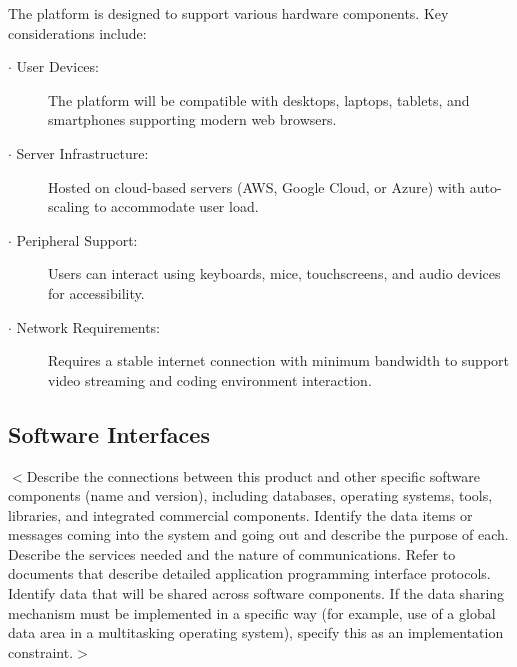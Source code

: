 \documentclass[a4paper, 11pt]{scrreprt}
\begin{document}
The platform is designed to support various hardware components. Key considerations include:
\begin{description}
    \item[$\cdot$ User Devices:] The platform will be compatible with desktops, laptops, tablets, and smartphones supporting modern web browsers.
    \item[$\cdot$ Server Infrastructure:] Hosted on cloud-based servers (AWS, Google Cloud, or Azure) with auto-scaling to accommodate user load.
    \item[$\cdot$ Peripheral Support:] Users can interact using keyboards, mice, touchscreens, and audio devices for accessibility.
    \item[$\cdot$ Network Requirements:] Requires a stable internet connection with minimum bandwidth to support video streaming and coding environment interaction.
\end{description}

\subsection{Software Interfaces}
$<$Describe the connections between this product and other specific software 
components (name and version), including databases, operating systems, tools, 
libraries, and integrated commercial components. Identify the data items or 
messages coming into the system and going out and describe the purpose of each.  
Describe the services needed and the nature of communications. Refer to 
documents that describe detailed application programming interface protocols.  
Identify data that will be shared across software components. If the data 
sharing mechanism must be implemented in a specific way (for example, use of a 
global data area in a multitasking operating system), specify this as an 
implementation constraint.$>$
\end{document}
